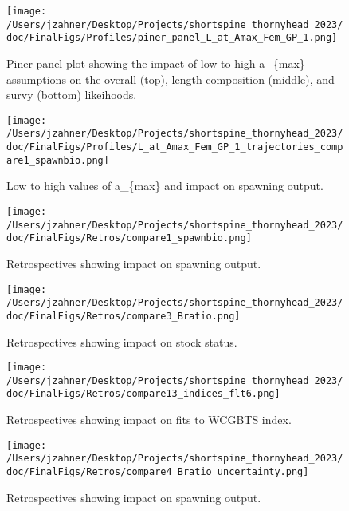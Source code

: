 \documentclass[11pt,
  english,
  letterpaper,
]{article}
\begin{document}
\begin{figure}
\centering
\texttt{[image: /Users/jzahner/Desktop/Projects/shortspine\_thornyhead\_2023/doc/FinalFigs/Profiles/piner\_panel\_L\_at\_Amax\_Fem\_GP\_1.png]}
\caption{Piner panel plot showing the impact of low to high a\_\{max\} assumptions on the overall (top), length composition (middle), and survy (bottom) likeihoods.\label{fig:growth_prof}}
\end{figure}

\begin{figure}
\centering
\texttt{[image: /Users/jzahner/Desktop/Projects/shortspine\_thornyhead\_2023/doc/FinalFigs/Profiles/L\_at\_Amax\_Fem\_GP\_1\_trajectories\_compare1\_spawnbio.png]}
\caption{Low to high values of a\_\{max\} and impact on spawning output.\label{fig:growth_spawnout}}
\end{figure}

\clearpage

\begin{figure}
\centering
\texttt{[image: /Users/jzahner/Desktop/Projects/shortspine\_thornyhead\_2023/doc/FinalFigs/Retros/compare1\_spawnbio.png]}
\caption{Retrospectives showing impact on spawning output.\label{fig:retros_spawnbio}}
\end{figure}

\begin{figure}
\centering
\texttt{[image: /Users/jzahner/Desktop/Projects/shortspine\_thornyhead\_2023/doc/FinalFigs/Retros/compare3\_Bratio.png]}
\caption{Retrospectives showing impact on stock status.\label{fig:retros_bratio}}
\end{figure}

\begin{figure}
\centering
\texttt{[image: /Users/jzahner/Desktop/Projects/shortspine\_thornyhead\_2023/doc/FinalFigs/Retros/compare13\_indices\_flt6.png]}
\caption{Retrospectives showing impact on fits to WCGBTS index.\label{fig:retros_indices}}
\end{figure}

\begin{figure}
\centering
\texttt{[image: /Users/jzahner/Desktop/Projects/shortspine\_thornyhead\_2023/doc/FinalFigs/Retros/compare4\_Bratio\_uncertainty.png]}
\caption{Retrospectives showing impact on spawning output.\label{fig:retros_spawnbio_uncertainty}}
\end{figure}
\end{document}
